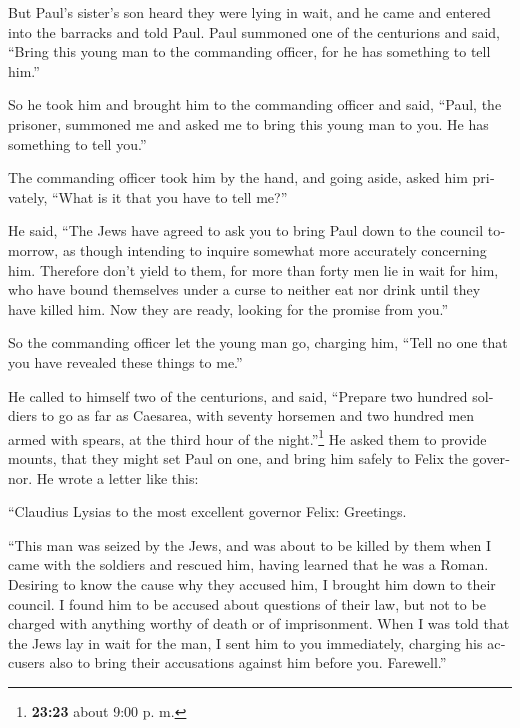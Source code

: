 \begin{paracol}{2}
\begin{otherlanguage}{english}
 But Paul's sister's son heard they were lying in wait,
and he came and entered into the barracks and told Paul. 
Paul summoned one of the centurions and said, ``Bring this young man to
the commanding officer, for he has something to tell him.''

 So he took him and brought him to the commanding officer
and said, ``Paul, the prisoner, summoned me and asked me to bring this
young man to you. He has something to tell you.''

 The commanding officer took him by the hand, and going
aside, asked him privately, ``What is it that you have to tell me?''

 He said, ``The Jews have agreed to ask you to bring Paul
down to the council tomorrow, as though intending to inquire somewhat
more accurately concerning him.  Therefore don't yield to
them, for more than forty men lie in wait for him, who have bound
themselves under a curse to neither eat nor drink until they have killed
him. Now they are ready, looking for the promise from you.''

 So the commanding officer let the young man go, charging
him, ``Tell no one that you have revealed these things to me.''

 He called to himself two of the centurions, and said,
``Prepare two hundred soldiers to go as far as Caesarea, with seventy
horsemen and two hundred men armed with spears, at the third hour of the
night.''\footnote{\textbf{23:23} about 9:00 p. m.}  He
asked them to provide mounts, that they might set Paul on one, and bring
him safely to Felix the governor.  He wrote a letter like
this:

 ``Claudius Lysias to the most excellent governor Felix:
Greetings.

 ``This man was seized by the Jews, and was about to be
killed by them when I came with the soldiers and rescued him, having
learned that he was a Roman.  Desiring to know the cause
why they accused him, I brought him down to their council.
 I found him to be accused about questions of their law,
but not to be charged with anything worthy of death or of imprisonment.
 When I was told that the Jews lay in wait for the man, I
sent him to you immediately, charging his accusers also to bring their
accusations against him before you. Farewell.''


\end{otherlanguage}
\end{paracol}
